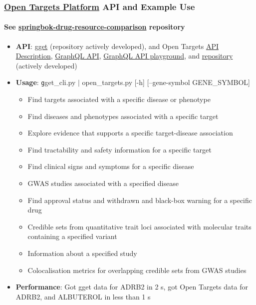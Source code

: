 \documentclass[aspectratio=169,xcolor=dvipsnames]{beamer}
\begin{document}
\begin{frame}
  \frametitle{\href{https://platform-docs.opentargets.org/getting-started}{Open
      Targets Platform} API and Example Use}
  \framesubtitle{See
    \href{https://github.com/ralatsdc/springbok-drug-resource-comparison}{springbok-drug-resource-comparison}
    repository}
  \begin{itemize}
  \item[] \textbf{API}: \href{https://github.com/pachterlab/gget}{gget}
    (repository actively developed), and Open Targets
    \href{https://platform.opentargets.org/api}{API Description},
    \href{https://platform-docs.opentargets.org/data-access/graphql-api}{GraphQL
      API},
    \href{https://api.platform.opentargets.org/api/v4/graphql/browser}{GraphQL
      API playground}, and
    \href{https://github.com/opentargets/platform-api}{repository}
    (actively developed)
  \item[] \textbf{Usage}: {\texttt gget\_cli.py $|$ open\_targets.py [-h]
    [--gene-symbol GENE\_SYMBOL]}
    \begin{itemize}
    \item Find targets associated with a specific disease or phenotype
    \item Find diseases and phenotypes associated with a specific
      target
    \item Explore evidence that supports a specific target-disease
      association
    \item Find tractability and safety information for a specific
      target
    \item Find clinical signs and symptoms for a specific disease
    \item GWAS studies associated with a specified disease
    \item Find approval status and withdrawn and black-box warning for
      a specific drug
    \item Credible sets from quantitative trait loci associated with
      molecular traits containing a specified variant
    \item Information about a specified study
    \item Colocalisation metrics for overlapping credible sets from
      GWAS studies
    \end{itemize}
  \item[] \textbf{Performance}: Got gget data for ADRB2 in 2 s, got Open
    Targets data for ADRB2, and ALBUTEROL in less than 1 s
  \end{itemize}
\end{frame}
\end{document}
